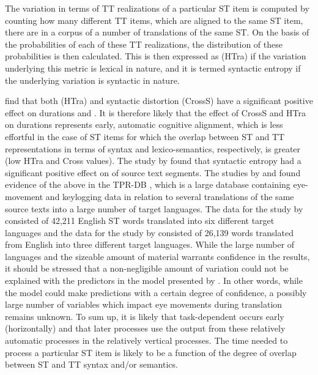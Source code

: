 \documentclass[output=paper]{LSP/langsci}
\begin{document}
The variation in terms of TT realizations of a particular ST item is computed by counting how many different TT items, which are aligned to the same ST item, there are in a corpus of a number of translations of the same ST. On the basis of the probabilities of each of these TT realizations, the distribution of these probabilities is then calculated. This is then expressed as  (HTra) \citep[31]{Carl2016CRITT} if the variation underlying this metric is lexical in nature, and it is termed syntactic entropy \citep{Bangalore2016} if the underlying variation is syntactic in nature.

\citet{Schaeffer2016Word} find that both  (HTra) and syntactic distortion (CrossS) have a significant positive effect on  durations and . It is therefore likely that the effect of CrossS and HTra on  durations represents early, automatic cognitive alignment, which is less effortful in the case of ST items for which the overlap between ST and TT representations in terms of syntax and lexico-semantics, respectively, is greater (low HTra and Cross values). The study by \citet{Bangalore2016} found that syntactic entropy had a significant positive effect on  of source text segments. The studies by \citet{Bangalore2016} and \citet{Schaeffer2016Word} found evidence of the above in the TPR-DB \citep{Carl2016CRITT}, which is a large database containing eye-movement and keylogging data in relation to several translations of the same source texts into a large number of target languages. The data for the study by \citet{Schaeffer2016Word} consisted of 42,211 English ST words translated into six different target languages and the data for the study by \citet{Bangalore2016} consisted of 26,139 words translated from English into three different target languages. While the large number of languages and the sizeable amount of material warrants confidence in the results, it should be stressed that a non-negligible amount of variation could not be explained with the predictors in the model presented by \citet{Schaeffer2016Word}. In other words, while the model could make predictions with a certain degree of confidence, a possibly large number of variables which impact eye movements during translation remains unknown.
To sum up, it is likely that task-dependent  occurs early (horizontally) and that later processes use the output from these relatively automatic processes in the relatively vertical processes. The time needed to process a particular ST item is likely to be a function of the degree of overlap between ST and TT syntax and\slash or semantics.
\end{document}
